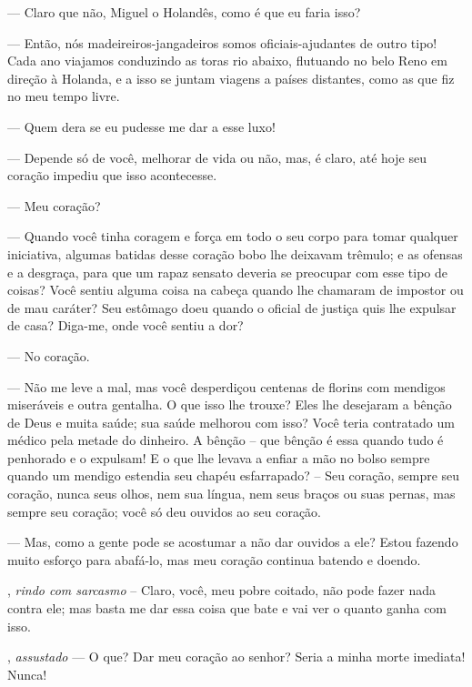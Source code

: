 \begin{myparindent}{0pt}
\begin{Parskip}
 --- Claro que não, Miguel o Holandês, como é que eu
faria isso?

 --- Então, nós madeireiros-jangadeiros somos
oficiais-ajudantes de outro tipo! Cada ano viajamos conduzindo as toras
rio abaixo, flutuando no belo Reno em direção à Holanda, e a isso se
juntam viagens a países distantes, como as que fiz no meu tempo livre.

 --- Quem dera se eu pudesse me dar a esse luxo!

 --- Depende só de você, melhorar de vida ou não, mas, é
claro, até hoje seu coração impediu que isso acontecesse.

 --- Meu coração?

 --- Quando você tinha coragem e força em todo o seu
corpo para tomar qualquer iniciativa, algumas batidas desse coração bobo
lhe deixavam trêmulo; e as ofensas e a desgraça, para que um rapaz
sensato deveria se preocupar com esse tipo de coisas? Você sentiu alguma
coisa na cabeça quando lhe chamaram de impostor ou de mau caráter? Seu
estômago doeu quando o oficial de justiça quis lhe expulsar de casa?
Diga-me, onde você sentiu a dor?

 --- No coração.

 --- Não me leve a mal, mas você desperdiçou centenas de
florins com mendigos miseráveis e outra gentalha. O que isso lhe trouxe?
Eles lhe desejaram a bênção de Deus e muita saúde; sua saúde melhorou
com isso? Você teria contratado um médico pela metade do dinheiro. A
bênção -- que bênção é essa quando tudo é penhorado e o expulsam! E o
que lhe levava a enfiar a mão no bolso sempre quando um mendigo estendia
seu chapéu esfarrapado? -- Seu coração, sempre seu coração, nunca seus
olhos, nem sua língua, nem seus braços ou suas pernas, mas sempre seu
coração; você só deu ouvidos ao seu coração.

 --- Mas, como a gente pode se acostumar a não dar
ouvidos a ele? Estou fazendo muito esforço para abafá-lo, mas meu
coração continua batendo e doendo.

, \emph{rindo com sarcasmo} -- Claro, você, meu pobre
coitado, não pode fazer nada contra ele; mas basta me dar essa coisa que
bate e vai ver o quanto ganha com isso.

, \emph{assustado} --- O que? Dar meu coração ao
senhor? Seria a minha morte imediata! Nunca!


\end{Parskip}
\end{myparindent}
